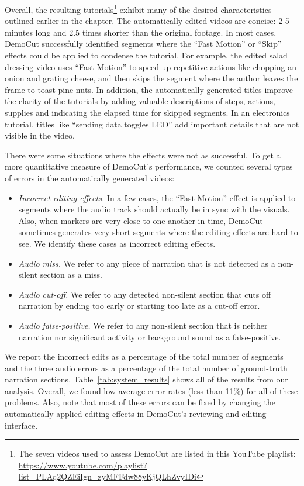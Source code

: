 Overall, the resulting tutorials\footnote{The seven videos used to assess DemoCut are listed in this YouTube playlist:\\\url{https://www.youtube.com/playlist?list=PLAq2QZEiIgn_zyMFFdw88yKjQLhZvyIDi}
} exhibit many of the desired
characteristics outlined earlier in the chapter.
%
The automatically edited videos are concise: 2-5 minutes long and 2.5
times shorter than the original footage.
%
In most cases, DemoCut successfully identified segments where the ``Fast
Motion'' or ``Skip'' effects could be applied to condense the tutorial.
%
For example, the edited salad dressing video uses ``Fast Motion'' to
speed up repetitive actions like chopping an onion and grating cheese,
and then skips the segment where the author leaves the frame to toast
pine nuts.
%
In addition, the automatically generated titles improve the clarity of
the tutorials by adding valuable descriptions of steps, actions,
supplies and indicating the elapsed time for skipped segments.
%
In an electronics tutorial, titles like ``sending data toggles LED''
add important details that are not visible in the video.

There were some situations where the effects were not as successful.
%
To get a more quantitative measure of DemoCut's performance, we
counted several types of errors in the automatically generated
videos:

\begin{itemize}
  \item {\em Incorrect editing effects.} In a few cases, the ``Fast Motion''
effect is applied to segments where the audio track should actually be
in sync with the visuals. Also, when markers are very close to one
another in time, DemoCut sometimes generates very short segments where the editing effects are hard to see. We identify these cases as incorrect editing effects.
  \item {\em Audio miss.} We refer to any piece of narration that is not
detected as a non-silent section as a miss.
  \item {\em Audio cut-off.} We refer to any detected non-silent section that
cuts off narration by ending too early or starting too late as a
cut-off error.
  \item {\em Audio false-positive.} We refer to any non-silent section that is
neither narration nor significant activity or background sound as a false-positive.
\end{itemize}

We report the incorrect edits as a percentage of the total number of
segments and the three audio errors as a percentage of the total
number of ground-truth narration sections.
%
Table~\ref{tab:system_results} shows all of the results from our
analysis.
%
Overall, we found low average error rates (less than 11\%) for all of
these problems.
%
Also, note that most of these errors can be fixed by changing the
automatically applied editing effects in DemoCut's reviewing and
editing interface.

